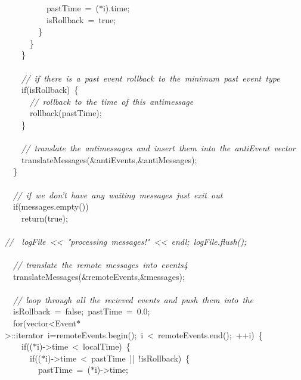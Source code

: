 {\ \ \ \ \ \ \ \ \ \ pastTime\ =\ ($\ast$i).time;\\
\ \ \ \ \ \ \ \ \ \ isRollback\ =\ true;\\
\ \ \ \ \ \ \ \ \}\\
\ \ \ \ \ \ \}\\
\ \ \ \ \}\\
\ \\
\ \ \ \ \textsl{//\ if\ there\ is\ a\ past\ event\ rollback\ to\ the\ minimum\ past\ event\ type}\\
\ \ \ \ if(isRollback)\ \{\\
\ \ \ \ \ \ \textsl{//\ rollback\ to\ the\ time\ of\ this\ antimessage}\\
\ \ \ \ \ \ rollback(pastTime);\\
\ \ \ \ \}\\
\ \\
\ \ \ \ \textsl{//\ translate\ the\ antimessages\ and\ insert\ them\ into\ the\ antiEvent\ vector}\\
\ \ \ \ translateMessages(\&antiEvents,\&antiMessages);\\
\ \ \}\\
\ \\
\ \ \textsl{//\ if\ we\ don't\ have\ any\ waiting\ messages\ just\ exit\ out}\\
\ \ if(messages.empty())\\
\ \ \ \ return(true);\\
\ \\
\textsl{//\ \ logFile\ <{}<{}\ "{}processing\ messages!"{}\ <{}<{}\ endl;\ logFile.flush();}\\
\ \\
\ \ \textsl{//\ translate\ the\ remote\ messages\ into\ events4}\\
\ \ translateMessages(\&remoteEvents,\&messages);\\
\ \\
\ \ \textsl{//\ loop\ through\ all\ the\ recieved\ events\ and\ push\ them\ into\ the}\\
\ \ isRollback\ =\ false;\ pastTime\ =\ 0.0;\\
\ \ for(vector<{}Event$\ast$>{}::iterator\ i=remoteEvents.begin();\ i\ <{}\ remoteEvents.end();\ ++i)\ \{\\
\ \ \ \ if(($\ast$i)-{}>{}time\ <{}\ localTime)\ \{\\
\ \ \ \ \ \ if(($\ast$i)-{}>{}time\ <{}\ pastTime\ ||\ !isRollback)\ \{\\
\ \ \ \ \ \ \ \ pastTime\ =\ ($\ast$i)-{}>{}time;\\
}
